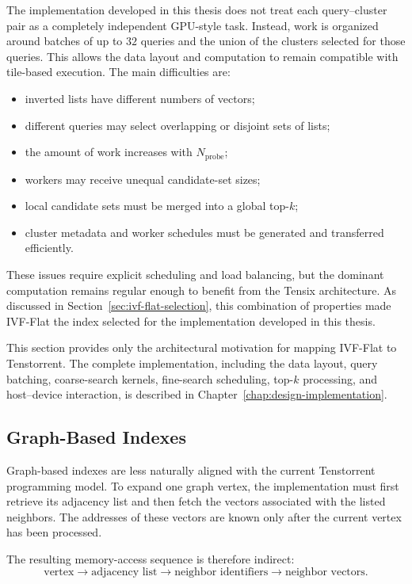 The implementation developed in this thesis does not treat each query--cluster pair as a completely independent GPU-style task. Instead, work is organized around batches of up to \(32\) queries and the union of the clusters selected for those queries. This allows the data layout and computation to remain compatible with tile-based execution.
\newline
The main difficulties are:
\begin{itemize}
\item inverted lists have different numbers of vectors;
\item different queries may select overlapping or disjoint sets of lists;
\item the amount of work increases with \(N_{\mathrm{probe}}\);
\item workers may receive unequal candidate-set sizes;
\item local candidate sets must be merged into a global top-\(k\);
\item cluster metadata and worker schedules must be generated and transferred efficiently.
\end{itemize}

These issues require explicit scheduling and load balancing, but the dominant computation remains regular enough to benefit from the Tensix architecture. As discussed in Section~\ref{sec:ivf-flat-selection}, this combination of properties made IVF-Flat the index selected for the implementation developed in this thesis.

This section provides only the architectural motivation for mapping IVF-Flat to Tenstorrent. The complete implementation, including the data layout, query batching, coarse-search kernels, fine-search scheduling, top-\(k\) processing, and host--device interaction, is described in Chapter~\ref{chap:design-implementation}.

\subsection{Graph-Based Indexes}
\label{subsec:graph-tt-fit}

Graph-based indexes are less naturally aligned with the current Tenstorrent programming model. To expand one graph vertex, the implementation must first retrieve its adjacency list and then fetch the vectors associated with the listed neighbors. The addresses of these vectors are known only after the current vertex has been processed.

The resulting memory-access sequence is therefore indirect:
\begin{equation}
\text{vertex}\rightarrow\text{adjacency list}\rightarrow\text{neighbor identifiers}\rightarrow\text{neighbor vectors}.
\end{equation}

